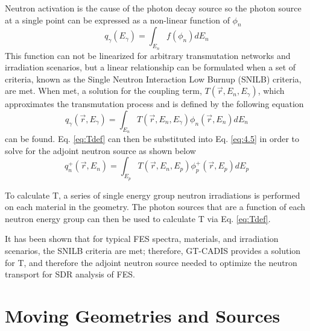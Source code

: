 Neutron activation is the cause of the photon decay source so the photon 
source at a single point can be
expressed as a non-linear function of $\phi_n$ 
\begin{equation} \label{eq:4.8}
	q_{\gamma}(E_{\gamma}) = \int_{E_n} f(\phi_{n}) dE_{n}
\end{equation}
This function can not be linearized for arbitrary transmutation networks
and irradiation scenarios, but a linear relationship can
be formulated when a set of criteria, known as the Single Neutron Interaction
Low Burnup (SNILB) criteria, are met.
When met, a solution for the coupling term, 
$T(\overrightarrow{r}, E_{n}, E_{\gamma})$, which approximates the
 transmutation process and is defined by the following equation
\begin{equation} \label{eq:Tdef}
	q_{\gamma}(\overrightarrow{r}, E_{\gamma}) = 
	\int_{E_n}T(\overrightarrow{r}, E_{n}, E_{\gamma})
	\phi_{n}(\overrightarrow{r}, E_{n}) dE_{n}
\end{equation}
can be found.
Eq. \ref{eq:Tdef} can then be substituted into Eq. \ref{eq:4.5} in order to 
solve for the adjoint neutron source as shown below
\begin{equation} \label{eq:gt_adj_nsrc}
	q_{n}^{+}(\overrightarrow{r},E_{n})
        = \int_{E_p}T(\overrightarrow{r}, E_{n}, E_{p})
	\phi_{p}^{+}(\overrightarrow{r}, E_{p}) dE_{p}
\end{equation}

To calculate T, a series of single energy group neutron irradiations is 
performed on each material in the geometry.  
The photon sources that are a function of each neutron energy group 
can then be used to calculate T via Eq. \ref{eq:Tdef}.

It has been shown that for typical FES spectra, materials, and irradiation
scenarios, the SNILB criteria are met; therefore, GT-CADIS provides a solution
for T, and therefore the adjoint neutron source needed to optimize the neutron
transport for SDR analysis of FES.


\section{Moving Geometries and Sources} \label{sec:moving_sys}

